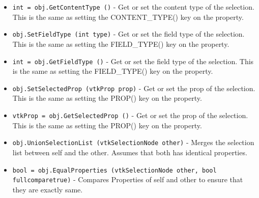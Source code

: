 \begin{itemize}
\item  \verb|int = obj.GetContentType ()| -  Get or set the content type of the selection.
 This is the same as setting the CONTENT\_TYPE() key on the property.

\item  \verb|obj.SetFieldType (int type)| -  Get or set the field type of the selection.
 This is the same as setting the FIELD\_TYPE() key on the property.

\item  \verb|int = obj.GetFieldType ()| -  Get or set the field type of the selection.
 This is the same as setting the FIELD\_TYPE() key on the property.

\item  \verb|obj.SetSelectedProp (vtkProp prop)| -  Get or set the prop of the selection.
 This is the same as setting the PROP() key on the property.

\item  \verb|vtkProp = obj.GetSelectedProp ()| -  Get or set the prop of the selection.
 This is the same as setting the PROP() key on the property.

\item  \verb|obj.UnionSelectionList (vtkSelectionNode other)| -  Merges the selection list between self and the other. Assumes that both has
 identical properties.

\item  \verb|bool = obj.EqualProperties (vtkSelectionNode other, bool fullcomparetrue)| -  Compares Properties of self and other to ensure that they are exactly same.

\end{itemize}
